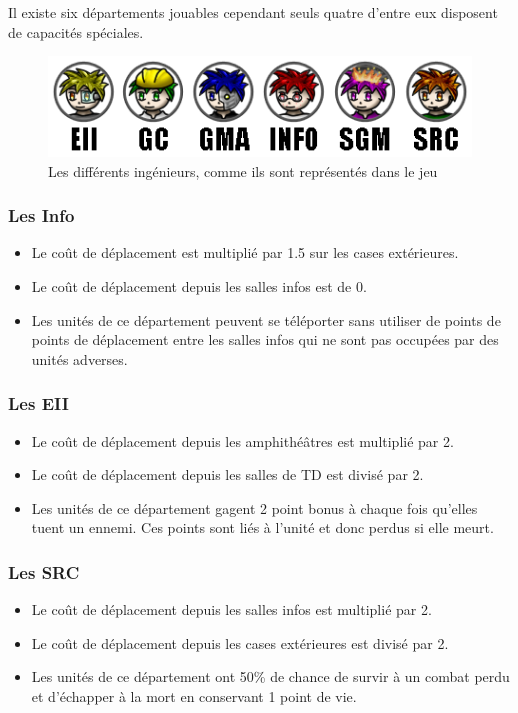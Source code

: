 Il existe six départements jouables cependant seuls quatre d'entre eux disposent de capacités spéciales. 

\begin{figure}[!h]
\centering
\includegraphics[width=.7\textwidth]{Parties/Images/Unites.png}
\caption{Les différents ingénieurs, comme ils sont représentés dans le jeu}
\label{fig:Unites}
\end{figure}

\subsubsection{Les Info}
\begin{itemize}
\item Le coût de déplacement est multiplié par 1.5 sur les cases extérieures.
\item Le coût de déplacement depuis les salles infos est de 0.
\item Les unités de ce département peuvent se téléporter sans utiliser de points de points de déplacement entre les salles infos qui ne sont pas occupées par des unités adverses.
\end{itemize}

\subsubsection{Les EII}
\begin{itemize}
\item Le coût de déplacement depuis les amphithéâtres est multiplié par 2.
\item Le coût de déplacement depuis les salles de TD est divisé par 2.
\item Les unités de ce département gagent 2 point bonus à chaque fois qu'elles tuent un ennemi. Ces points sont liés à l'unité et donc perdus si elle meurt.
\end{itemize} 

\subsubsection{Les SRC}
\begin{itemize}
\item Le coût de déplacement depuis les salles infos est multiplié par 2.
\item Le coût de déplacement depuis les cases extérieures est divisé par 2.
\item Les unités de ce département ont 50\% de chance de survir à un combat perdu et d'échapper à la mort en conservant 1 point de vie. 
\end{itemize}

